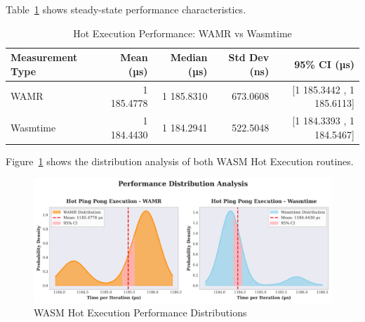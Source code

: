 Table~\ref{tab:wasm-hot-execution-performance} shows steady-state performance characteristics.

\begin{table}[h]
    \centering
    \caption{Hot Execution Performance: WAMR vs Wasmtime}
    \label{tab:wasm-hot-execution-performance}
    \begin{tabular}{lrrrr}
        \toprule
        \textbf{Measurement Type} & \textbf{Mean (µs)} & \textbf{Median (µs)} & \textbf{Std Dev (ns)} & \textbf{95\% CI (µs)} \\
        \midrule
        WAMR          & 1 185.4778 & 1 185.8310 & 673.0608 & [1 185.3442 , 1 185.6113] \\
        Wasmtime      & 1 184.4430 & 1 184.2941 & 522.5048 & [1 184.3393 , 1 184.5467] \\
        \bottomrule
    \end{tabular}
\end{table}

Figure~\ref{fig:wasm-hot-execution-distributions} shows the distribution analysis of both \acrshort{WASM} Hot Execution routines.
\begin{figure}[h]
    \centering
    \includegraphics[width=\textwidth]{images/wasm-hot-distributions}
    \caption{\acrshort{WASM} Hot Execution Performance Distributions}
    \label{fig:wasm-hot-execution-distributions}
\end{figure}





